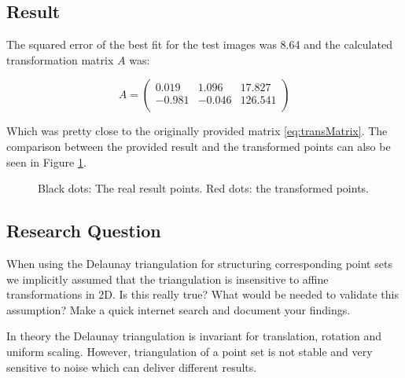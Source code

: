 \subsection{Result}
The squared error of the best fit for the test images was 8.64 and the calculated transformation matrix $A$ was:

\begin{equation}
	A = 
	\begin{pmatrix}
		0.019 & 1.096 & 17.827 \\
		-0.981 & -0.046 & 126.541 \\
	\end{pmatrix} 
\end{equation}

Which was pretty close to the originally provided matrix \ref{eq:transMatrix}. The comparison between the provided result and the transformed points can also be seen in Figure \ref{fig:TriResult}.

\begin{figure}
	\centering
	\caption{Black dots: The real result points. Red dots: the transformed points.}
	\label{fig:TriResult}
\end{figure}

\subsection{Research Question}
\begin{itshape}
	When using the Delaunay triangulation for structuring corresponding point sets we implicitly assumed that the triangulation is insensitive to affine transformations in 2D. Is this really true? What would be needed to validate this assumption? Make a quick internet search and document your findings.	
\end{itshape}

In theory the Delaunay triangulation is invariant for translation, rotation and uniform scaling. However, triangulation of a point set is not stable and very sensitive to noise which can deliver different results.







